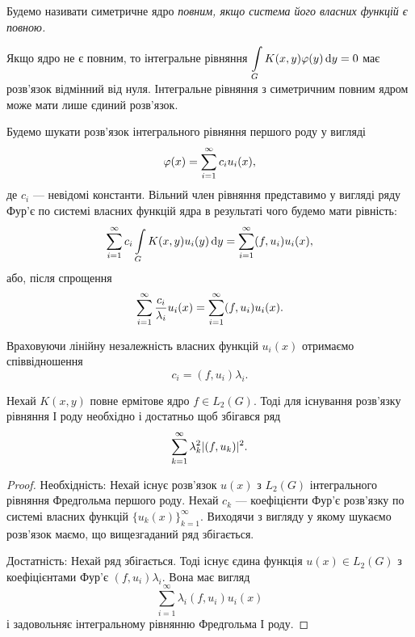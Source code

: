 \begin{definition}
	Будемо називати симетричне ядро \it{повним}, якщо система його власних функцій є повною.
\end{definition}

Якщо ядро не є повним, то інтегральне рівняння $\displaystyle\int\limits_G K(x,y)\varphi(y)\mathop{}\!\mathrm{d} y=0$ має розв'язок відмінний від нуля. Інтегральне рівняння з симетричним повним ядром може мати лише єдиний розв'язок. \medskip

Будемо шукати розв'язок інтегрального рівняння першого роду у вигляді
\begin{equation}
	\varphi(x) = \displaystyle\sum\limits_{i=1}^\infty c_i u_i(x),
\end{equation}
де $c_i$ --- невідомі константи. Вільний член рівняння представимо у вигляді ряду Фур'є по системі власних функцій ядра в результаті чого будемо мати рівність:
\begin{equation}
	\displaystyle\sum\limits_{i=1}^\infty c_i \displaystyle\int\limits_G K(x,y) u_i(y) \mathop{}\!\mathrm{d} y = \displaystyle\sum\limits_{i=1}^\infty (f,u_i)u_i(x),
\end{equation}
або, після спрощення
\begin{equation}
	\displaystyle\sum\limits_{i=1}^\infty \dfrac{c_i}{\lambda_i} u_i(x) = \displaystyle\sum\limits_{i=1}^\infty (f,u_i)u_i(x).
\end{equation}

Враховуючи лінійну незалежність власних функцій $u_i(x)$ отримаємо співвідношення 
\begin{equation}
	c_i = (f, u_i) \lambda_i.
\end{equation}

\begin{theorem} 
	Нехай $K(x, y)$ повне ермітове ядро $f \in L_2(G)$. Тоді для існування розв'язку рівняння І роду необхідно і достатньо щоб збігався ряд
	\begin{equation}
		\displaystyle\sum\limits_{k=1}^\infty \lambda_k^2 |(f, u_k)|^2.
	\end{equation}
\end{theorem}

\begin{proof}
	Необхідність: Нехай існує розв'язок $u(x)$ з $L_2(G)$ інтегрального рівняння Фредгольма першого роду. Нехай $c_k$ --- коефіцієнти Фур'є розв'язку по системі власних функцій $\{u_k(x)\}_{k=1}^\infty$. Виходячи з вигляду у якому шукаємо розв'язок маємо, що вищезгаданий ряд збігається. \medskip

	Достатність: Нехай ряд збігається. Тоді існує єдина функція $u(x) \in L_2(G)$ з коефіцієнтами Фур'є $(f,u_i)\lambda_i$. Вона має вигляд
	\begin{equation}
		\sum_{i=1}^\infty \lambda_i(f,u_i)u_i(x)
	\end{equation}
	і задовольняє інтегральному рівнянню Фредгольма І роду.
\end{proof}

